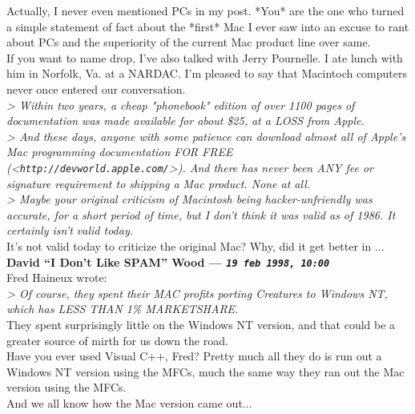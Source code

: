 \documentclass[11pt,twoside,a4paper]{article}
\begin{document}
\begin{multicols*}{2}
Actually, I never even mentioned PCs in my post.  *You* are the one who turned a simple statement of fact about the *first* Mac I ever saw into an excuse to rant about PCs and the superiority of the current Mac product line over same.~\\


If you want to name drop, I've also talked with Jerry Pournelle.  I ate lunch with him in Norfolk, Va. at a NARDAC.  I'm pleased to say that Macintoch computers never once entered our conversation.~\\

\emph{> Within two years, a cheap "phonebook" edition of over 1100 pages of documentation was made available for about \$25, at a LOSS from Apple.}~\\
\emph{> And these days, anyone with some patience can download almost all of Apple's Mac programming documentation FOR FREE (<\texttt{http://devworld.apple.com/}>). And there has never been ANY fee or signature requirement to shipping a Mac product. None at all.}~\\
\emph{> Maybe your original criticism of Macintosh being hacker-unfriendly was accurate, for a short period of time, but I don't think it was valid as of 1986. It certainly isn't valid today. }~\\

It's not valid today to criticize the original Mac?  Why, did it get better in ...~\\

 
		
	
		
\textbf{David ``I Don't Like SPAM'' Wood --- \emph{\texttt{19 feb 1998, 10:00}}}~\\

Fred Haineux wrote:~\\
\emph{> Of course, they spent their MAC profits porting Creatures to Windows NT, which has LESS THAN 1\% MARKETSHARE.}~\\

They spent surprisingly little on the Windows NT version, and that could be a greater source of mirth for us down the road.~\\

Have you ever used Visual C++, Fred? Pretty much all they do is run out a Windows NT version using the MFCs, much the same way they ran out the Mac version using the MFCs.~\\

And we all know how the Mac version came out...~\\


\end{multicols*}
\end{document}
